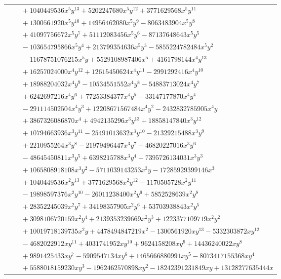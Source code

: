 \documentclass[11pt]{article}
\begin{document}
\begin{longtable}{@{}ll@{}}
 & $\quad +1040449536x^{5}y^{13}+5202247680x^{5}y^{12}+3771629568x^{5}y^{11}$\\
 & $\quad +1300561920x^{5}y^{10}+14956462080x^{5}y^{9}-8063483904x^{5}y^{8}$\\
 & $\quad +41097756672x^{5}y^{7}+51112083456x^{5}y^{6}-87137648643x^{5}y^{5}$\\
 & $\quad -103654795866x^{5}y^{4}+213799354636x^{5}y^{3}-5855224782484x^{5}y^{2}$\\
 & $\quad -11678751076215x^{5}y+5529108987406x^{5}+4161798144x^{4}y^{13}$\\
 & $\quad +16257024000x^{4}y^{12}+12615450624x^{4}y^{11}-2991292416x^{4}y^{10}$\\
 & $\quad +18988204032x^{4}y^{9}-10534551552x^{4}y^{8}-54883713024x^{4}y^{7}$\\
 & $\quad +6242697216x^{4}y^{6}+77253384377x^{4}y^{5}-33147177870x^{4}y^{4}$\\
 & $\quad -291114502504x^{4}y^{3}+12208671567484x^{4}y^{2}-2432832785905x^{4}y$\\
 & $\quad +3867326086870x^{4}+4942135296x^{3}y^{13}+18858147840x^{3}y^{12}$\\
 & $\quad +10794663936x^{3}y^{11}-25491013632x^{3}y^{10}-21329215488x^{3}y^{9}$\\
 & $\quad +2210955264x^{3}y^{8}-21979496447x^{3}y^{7}-46820227016x^{3}y^{6}$\\
 & $\quad -48645450811x^{3}y^{5}+6398215788x^{3}y^{4}-7395726134031x^{3}y^{3}$\\
 & $\quad +1065808918108x^{3}y^{2}-5711039143253x^{3}y-17285929399146x^{3}$\\
 & $\quad +1040449536x^{2}y^{13}+3771629568x^{2}y^{12}-1170505728x^{2}y^{11}$\\
 & $\quad -19898597376x^{2}y^{10}-26011238400x^{2}y^{9}+5852528639x^{2}y^{8}$\\
 & $\quad +28352245039x^{2}y^{7}+34198357905x^{2}y^{6}+53703938843x^{2}y^{5}$\\
 & $\quad +3098106720159x^{2}y^{4}+2139353239669x^{2}y^{3}+1223377109719x^{2}y^{2}$\\
 & $\quad +10019718139735x^{2}y+4478494847219x^{2}-1300561920xy^{13}-5332303872xy^{12}$\\
 & $\quad -4682022912xy^{11}+4031741952xy^{10}+9624158208xy^{9}+14436240022xy^{8}$\\
 & $\quad +9891425433xy^{7}-5909547134xy^{6}+1465666880991xy^{5}-8073417155368xy^{4}$\\
 & $\quad +5588018159230xy^{3}-1962462570898xy^{2}-18242391231849xy+13128277635444x$\\

\end{longtable}
\end{document}
